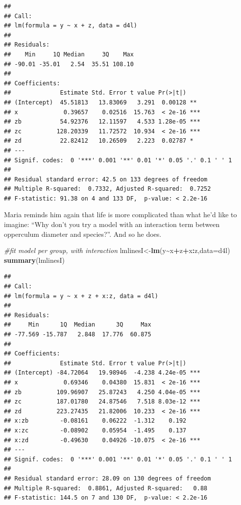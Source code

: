 \documentclass[
]{book}
\newenvironment{Shaded}{\begin{snugshade}}{\end{snugshade}}
\newcommand{\AttributeTok}[1]{\textcolor[rgb]{0.13,0.29,0.53}{#1}}
\newcommand{\CommentTok}[1]{\textcolor[rgb]{0.56,0.35,0.01}{\textit{#1}}}
\newcommand{\FunctionTok}[1]{\textcolor[rgb]{0.13,0.29,0.53}{\textbf{#1}}}
\newcommand{\NormalTok}[1]{#1}
\newcommand{\OtherTok}[1]{\textcolor[rgb]{0.56,0.35,0.01}{#1}}
\newcommand{\SpecialCharTok}[1]{\textcolor[rgb]{0.81,0.36,0.00}{\textbf{#1}}}
\begin{document}
\begin{verbatim}
## 
## Call:
## lm(formula = y ~ x + z, data = d4l)
## 
## Residuals:
##    Min     1Q Median     3Q    Max 
## -90.01 -35.01   2.54  35.51 108.10 
## 
## Coefficients:
##              Estimate Std. Error t value Pr(>|t|)    
## (Intercept)  45.51813   13.83069   3.291  0.00128 ** 
## x             0.39657    0.02516  15.763  < 2e-16 ***
## zb           54.92376   12.11597   4.533 1.28e-05 ***
## zc          128.20339   11.72572  10.934  < 2e-16 ***
## zd           22.82412   10.26509   2.223  0.02787 *  
## ---
## Signif. codes:  0 '***' 0.001 '**' 0.01 '*' 0.05 '.' 0.1 ' ' 1
## 
## Residual standard error: 42.5 on 133 degrees of freedom
## Multiple R-squared:  0.7332, Adjusted R-squared:  0.7252 
## F-statistic: 91.38 on 4 and 133 DF,  p-value: < 2.2e-16
\end{verbatim}

Maria reminds him again that life is more complicated than what he'd like to imagine: ``Why don't you try a model with an interaction term between opperculum diameter and species?''. And so he does.

\begin{Shaded}
\begin{Highlighting}[]
\CommentTok{\#fit model per group, with interaction}
\NormalTok{lmlinesI}\OtherTok{\textless{}{-}}\FunctionTok{lm}\NormalTok{(y}\SpecialCharTok{\textasciitilde{}}\NormalTok{x}\SpecialCharTok{+}\NormalTok{z}\SpecialCharTok{+}\NormalTok{x}\SpecialCharTok{:}\NormalTok{z,}\AttributeTok{data=}\NormalTok{d4l)}
\FunctionTok{summary}\NormalTok{(lmlinesI)}
\end{Highlighting}
\end{Shaded}

\begin{verbatim}
## 
## Call:
## lm(formula = y ~ x + z + x:z, data = d4l)
## 
## Residuals:
##     Min      1Q  Median      3Q     Max 
## -77.569 -15.787   2.848  17.776  60.875 
## 
## Coefficients:
##              Estimate Std. Error t value Pr(>|t|)    
## (Intercept) -84.72064   19.98946  -4.238 4.24e-05 ***
## x             0.69346    0.04380  15.831  < 2e-16 ***
## zb          109.96907   25.87243   4.250 4.04e-05 ***
## zc          187.01780   24.87546   7.518 8.03e-12 ***
## zd          223.27435   21.82006  10.233  < 2e-16 ***
## x:zb         -0.08161    0.06222  -1.312    0.192    
## x:zc         -0.08902    0.05954  -1.495    0.137    
## x:zd         -0.49630    0.04926 -10.075  < 2e-16 ***
## ---
## Signif. codes:  0 '***' 0.001 '**' 0.01 '*' 0.05 '.' 0.1 ' ' 1
## 
## Residual standard error: 28.09 on 130 degrees of freedom
## Multiple R-squared:  0.8861, Adjusted R-squared:   0.88 
## F-statistic: 144.5 on 7 and 130 DF,  p-value: < 2.2e-16
\end{verbatim}
\end{document}
